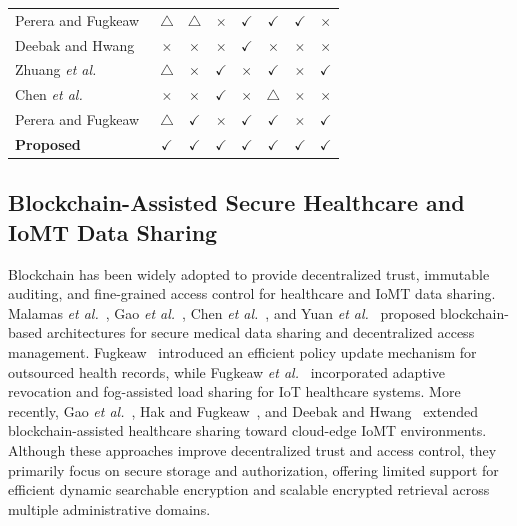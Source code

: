 \documentclass{ieeetj}
\theoremstyle{ieee-style}
\begin{document}
\begin{table}[t]
\begin{tabular}{lccccccc}
Perera and Fugkeaw~\cite{ref48}
& $\triangle$ & $\triangle$ & $\times$ & $\checkmark$ & $\checkmark$ & $\checkmark$ & $\times$ \\

Deebak and Hwang~\cite{ref51}
& $\times$ & $\times$ & $\times$ & $\checkmark$ & $\times$ & $\times$ & $\times$ \\

Zhuang \textit{et al.}~\cite{ref52}
& $\triangle$ & $\times$ & $\checkmark$ & $\times$ & $\checkmark$ & $\times$ & $\checkmark$ \\

Chen \textit{et al.}~\cite{ref53}
& $\times$ & $\times$ & $\checkmark$ & $\times$ & $\triangle$ & $\times$ & $\times$ \\

Perera and Fugkeaw~\cite{ref54}
& $\triangle$& $\checkmark$ & $\times$ & $\checkmark$ & $\checkmark$ & $\times$ & $\checkmark$ \\
\hline
\textbf{Proposed}
& $\checkmark$
& $\checkmark$
& $\checkmark$
& $\checkmark$
& $\checkmark$
& $\checkmark$
& $\checkmark$ \\
\hline
\end{tabular}
\end{table}


\subsection{Blockchain-Assisted Secure Healthcare and IoMT Data Sharing}

Blockchain has been widely adopted to provide decentralized trust, immutable auditing, and fine-grained access control for healthcare and IoMT data sharing. Malamas \textit{et al.}~\cite{ref1}, Gao \textit{et al.}~\cite{ref2}, Chen \textit{et al.}~\cite{ref4}, and Yuan \textit{et al.}~\cite{ref5} proposed blockchain-based architectures for secure medical data sharing and decentralized access management. Fugkeaw~\cite{ref3} introduced an efficient policy update mechanism for outsourced health records, while Fugkeaw \textit{et al.}~\cite{ref21} incorporated adaptive revocation and fog-assisted load sharing for IoT healthcare systems. More recently, Gao \textit{et al.}~\cite{ref47}, Hak and Fugkeaw~\cite{ref50}, and Deebak and Hwang~\cite{ref51} extended blockchain-assisted healthcare sharing toward cloud-edge IoMT environments. Although these approaches improve decentralized trust and access control, they primarily focus on secure storage and authorization, offering limited support for efficient dynamic searchable encryption and scalable encrypted retrieval across multiple administrative domains.
\end{document}
